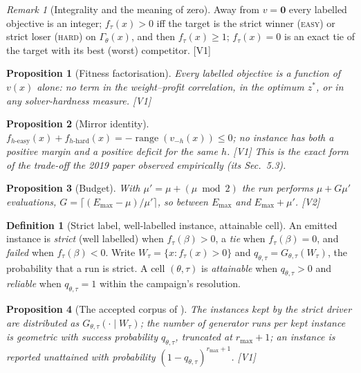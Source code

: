 \documentclass[a4paper,11pt]{article}
\newcommand{\Emax}{E_{\max}}
\newcommand{\Gam}{\Gamma_{\theta}}
\newcommand{\code}[1]{\path{#1}}
\newcommand{\Gtt}{G_{\theta,\tau}}
\newcommand{\evid}[1]{\textcolor{inkSoft}{\scriptsize[#1]}}
\theoremstyle{plain}
\newtheorem{proposition}{Proposition}
\theoremstyle{definition}
\newtheorem{definition}{Definition}
\theoremstyle{remark}
\newtheorem{remark}{Remark}
\begin{document}
\begin{remark}[Integrality and the meaning of zero]\label{prop:zero}
Away from $v=\mathbf 0$ every labelled objective is an integer; $f_\tau(x)>0$ iff the target
is the strict winner (\textsc{easy}) or strict loser (\textsc{hard}) on $\Gam(x)$, and then
$f_\tau(x)\ge1$; $f_\tau(x)=0$ is an exact tie of the target with its best (worst)
competitor. \evid{V1}
\end{remark}

\begin{proposition}[Fitness factorisation]\label{prop:factor}
Every labelled objective is a function of $v(x)$ alone: no term in the weight--profit
correlation, in the optimum $z^{*}$, or in any solver-hardness measure. \evid{V1}
\end{proposition}

\begin{proposition}[Mirror identity]\label{prop:mirror}
$f_{h\text{-easy}}(x)+f_{h\text{-hard}}(x)=-\operatorname{range}(v_{-h}(x))\le0$; no
instance has both a positive margin and a positive deficit for the same $h$. \evid{V1} This
is the exact form of the trade-off the 2019 paper observed empirically (its Sec.~5.3).
\end{proposition}

\begin{proposition}[Budget]\label{prop:budget}
With $\mu'=\mu+(\mu\bmod2)$ the run performs $\mu+G\mu'$ evaluations,
$G=\lceil(\Emax-\mu)/\mu'\rceil$, so between $\Emax$ and $\Emax+\mu'$. \evid{V2}
\end{proposition}

\begin{definition}[Strict label, well-labelled instance, attainable cell]\label{def:strict}
An emitted instance is \emph{strict} (well labelled) when $f_\tau(\beta)>0$, a \emph{tie}
when $f_\tau(\beta)=0$, and \emph{failed} when $f_\tau(\beta)<0$. Write
$W_\tau=\{x:f_\tau(x)>0\}$ and $q_{\theta,\tau}=\Gtt(W_\tau)$, the probability that a run
is strict. A cell $(\theta,\tau)$ is \emph{attainable} when $q_{\theta,\tau}>0$ and
\emph{reliable} when $q_{\theta,\tau}=1$ within the campaign's resolution.
\end{definition}

\begin{proposition}[The accepted corpus of \code{--require-strict}]\label{prop:conditional}
The instances kept by the strict driver are distributed as $\Gtt(\cdot\mid W_\tau)$; the
number of generator runs per kept instance is geometric with success probability
$q_{\theta,\tau}$, truncated at $r_{\max}+1$; an instance is reported unattained with
probability $(1-q_{\theta,\tau})^{r_{\max}+1}$. \evid{V1}
\end{proposition}
\end{document}
